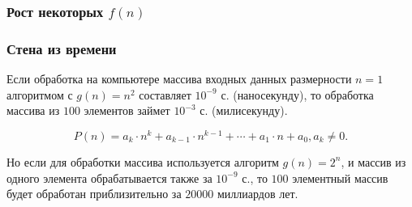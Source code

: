 \begin{frame}
    \frametitle{Рост некоторых $f(n)$}
    
    \begin{center}
    \end{center}
\end{frame}


\begin{frame}
    \frametitle{Стена из времени}
    
    \begin{example}
        Если обработка на компьютере массива входных данных размерности $n=1$ алгоритмом с $g(n)=n^2$ составляет $10^{-9}$ с. (наносекунду), то обработка массива из $100$ элементов займет $10^{-3}$ с. (милисекунду). 
    \end{example}
    
    \begin{equation}
        P(n)=a_k\cdot n^k + a_{k-1}\cdot n^{k-1} + \cdots + a_1\cdot n + a_0, a_k\neq 0.
        \label{eq:alg:polinom}
    \end{equation}
    
    \begin{example}
        Но если для обработки массива используется алгоритм $g(n)=2^n$, и массив из одного элемента обрабатывается также за $10^{-9}$ с., то $100$ элементный массив будет обработан приблизительно за $20000$ миллиардов лет.    
    \end{example}
\end{frame}

